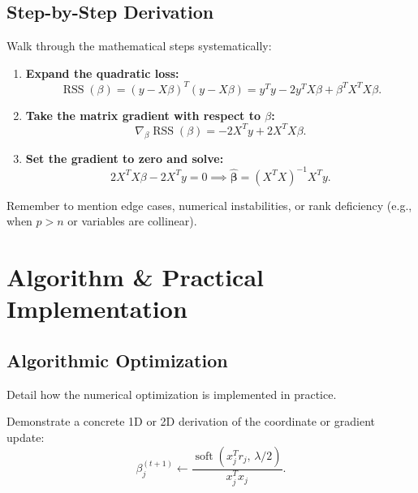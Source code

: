 \documentclass[11pt,a4paper,oneside]{book}
\newcommand{\RSS}{\operatorname{RSS}}
\newcommand{\bhat}{\widehat{\boldsymbol{\beta}}}
\begin{document}
\section{Step-by-Step Derivation}
Walk through the mathematical steps systematically:

\begin{enumerate}
  \item \textbf{Expand the quadratic loss:}
  \begin{equation}
    \RSS(\beta) = (y - X\beta)^T(y - X\beta) = y^Ty - 2y^TX\beta + \beta^TX^TX\beta.
  \end{equation}

  \item \textbf{Take the matrix gradient with respect to $\beta$:}
  \begin{equation}
    \nabla_\beta \RSS(\beta) = -2X^Ty + 2X^TX\beta.
  \end{equation}

  \item \textbf{Set the gradient to zero and solve:}
  \begin{equation}
    2X^TX\beta - 2X^Ty = 0 \implies \boxed{\bhat = (X^TX)^{-1}X^Ty.}
  \end{equation}
\end{enumerate}

\begin{warningbox}[title=Watch out for singularities]
Remember to mention edge cases, numerical instabilities, or rank deficiency (e.g., when $p > n$ or variables are collinear).
\end{warningbox}


\chapter{Algorithm \& Practical Implementation}

\section{Algorithmic Optimization}
Detail how the numerical optimization is implemented in practice.

\begin{worked}[title=Step-by-step update rule]
Demonstrate a concrete 1D or 2D derivation of the coordinate or gradient update:
\begin{equation}
  \beta_j^{(t+1)} \leftarrow \frac{\operatorname{soft}(x_j^Tr_j,\, \lambda/2)}{x_j^Tx_j}.
\end{equation}
\end{worked}
\end{document}
